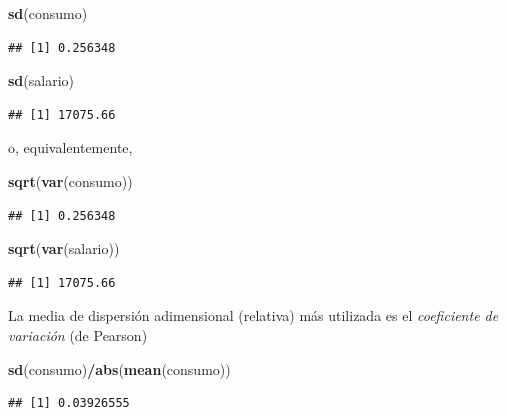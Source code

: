 \documentclass[]{book}
\newenvironment{Shaded}{\begin{snugshade}}{\end{snugshade}}
\newcommand{\KeywordTok}[1]{\textcolor[rgb]{0.13,0.29,0.53}{\textbf{#1}}}
\newcommand{\OperatorTok}[1]{\textcolor[rgb]{0.81,0.36,0.00}{\textbf{#1}}}
\newcommand{\NormalTok}[1]{#1}
\begin{document}
\begin{Shaded}
\begin{Highlighting}[]
\KeywordTok{sd}\NormalTok{(consumo)}
\end{Highlighting}
\end{Shaded}

\begin{verbatim}
## [1] 0.256348
\end{verbatim}

\begin{Shaded}
\begin{Highlighting}[]
\KeywordTok{sd}\NormalTok{(salario)}
\end{Highlighting}
\end{Shaded}

\begin{verbatim}
## [1] 17075.66
\end{verbatim}

o, equivalentemente,

\begin{Shaded}
\begin{Highlighting}[]
\KeywordTok{sqrt}\NormalTok{(}\KeywordTok{var}\NormalTok{(consumo))}
\end{Highlighting}
\end{Shaded}

\begin{verbatim}
## [1] 0.256348
\end{verbatim}

\begin{Shaded}
\begin{Highlighting}[]
\KeywordTok{sqrt}\NormalTok{(}\KeywordTok{var}\NormalTok{(salario))}
\end{Highlighting}
\end{Shaded}

\begin{verbatim}
## [1] 17075.66
\end{verbatim}

La media de dispersión adimensional (relativa) más utilizada es el
\emph{coeficiente de variación} (de Pearson)

\begin{Shaded}
\begin{Highlighting}[]
\KeywordTok{sd}\NormalTok{(consumo)}\OperatorTok{/}\KeywordTok{abs}\NormalTok{(}\KeywordTok{mean}\NormalTok{(consumo))}
\end{Highlighting}
\end{Shaded}

\begin{verbatim}
## [1] 0.03926555
\end{verbatim}
\end{document}

